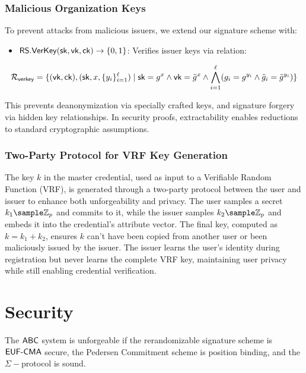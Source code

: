 \subsubsection{Malicious Organization Keys}
To prevent attacks from malicious issuers, we extend our signature scheme with:
\begin{itemize}
    \item $\mathsf{RS.VerKey}(\mathsf{sk}, \mathsf{vk}, \mathsf{ck}) \to \{0,1\}$: Verifies issuer keys via relation:
\end{itemize}
\[
\mathcal{R}_{\mathsf{verkey}} = \{(\mathsf{vk}, \mathsf{ck}),(\mathsf{sk}, x, \{y_i\}_{i=1}^\ell) \mid \mathsf{sk} = g^x \wedge \mathsf{vk} = \tilde{g}^x \wedge \bigwedge_{i=1}^\ell (g_i = g^{y_i} \wedge \tilde{g}_i = \tilde{g}^{y_i})\}
\]

This prevents deanonymization via specially crafted keys, and signature forgery via hidden key relationships. In security proofs, extractability enables reductions to standard cryptographic assumptions.

\subsubsection{Two-Party Protocol for VRF Key Generation}
The key $k$ in the master credential, used as input to a Verifiable Random Function (VRF), is generated through a two-party protocol between the user and issuer to enhance both unforgeability and privacy. The user samples a secret $k_1 \sample \mathbb{Z}_p$ and commits to it, while the issuer samples $k_2 \sample \mathbb{Z}_p$ and embeds it into the credential's attribute vector. The final key, computed as $k = k_1 + k_2$, ensures $k$ can't have been copied from another user or been maliciously issued by the issuer. The issuer learns the user's identity during registration but never learns the complete VRF key, maintaining user privacy while still enabling credential verification.


\section{Security}
\begin{theorem}[Unforgeability]
The $\mathsf{ABC}$ system is unforgeable if the rerandomizable signature scheme is $\mathsf{EUF\text{-}CMA}$ secure, the Pedersen Commitment scheme is position binding, and the $\Sigma-$protocol is sound.
\end{theorem}

